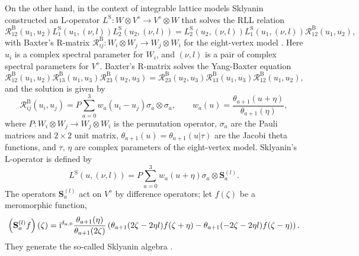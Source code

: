 On the other hand, in the context of integrable lattice models Sklyanin
constructed an L-operator $L^{\mathrm{S}}:W\otimes V^{\diamond}\rightarrow V^{\diamond}\otimes W$
that solves the RLL relation \cite{MR684124}
\begin{equation}
    \mathcal{R}_{12}^{\mathrm{B}}(u_{1},u_{2})
    L_{1}^{\mathrm{S}}(u_{1},(\nu,l))
    L_{2}^{\mathrm{S}}(u_{2},(\nu,l))
      =
          L_{2}^{\mathrm{S}}(u_{2},(\nu,l))
          L_{1}^{\mathrm{S}}(u_{1},(\nu,l))
          \mathcal{R}_{12}^{\mathrm{B}}(u_{1},u_{2}),
\end{equation}
with Baxter's R-matrix $\mathcal{R}_{ij}^{\mathrm{B}}:W_{i}\otimes W_{j}\rightarrow W_{j}\otimes W_{i}$
for the eight-vertex model \cite{Baxter:1971cr,Baxter:1972hz}. Here $u_{i}$
is a complex spectral parameter for $W_{i}$, and $(\nu,l)$
is a pair of complex spectral parameters for $V^{\diamond}$.
Baxter's R-matrix solves the Yang-Baxter equation
\begin{equation}
    \mathcal{R}_{12}^{\mathrm{B}}(u_{1},u_{2})
    \mathcal{R}_{13}^{\mathrm{B}}(u_{1},u_{3})
    \mathcal{R}_{23}^{\mathrm{B}}(u_{2},u_{3})
      =
        \mathcal{R}_{23}^{\mathrm{B}}(u_{2},u_{3})
        \mathcal{R}_{13}^{\mathrm{B}}(u_{1},u_{3})
        \mathcal{R}_{12}^{\mathrm{B}}(u_{1},u_{2}),
\end{equation}
and the solution is given by
\begin{equation}
    \mathcal{R}_{ij}^{\mathrm{B}}(u_{i},u_{j})
      =  P\sum_{a=0}^{3}w_{a}(u_{i}-u_{j})  \sigma_{a}  \otimes  \sigma_{a},
        \qquad  w_{a}(u)  =  \frac{\theta_{a+1}(u+\eta)}{\theta_{a+1}(\eta)},
\end{equation}
where $P:W_{i}\otimes W_{j}\to W_{j}\otimes W_{i}$ is the
permutation operator, $\sigma_{a}$ are the Pauli matrices and $2\times2$
unit matrix, $\theta_{a+1}(u)=\theta_{a+1}(u|\tau)$ are the Jacobi
theta functions, and $\tau,\,\eta$ are complex parameters of the
eight-vertex model. Sklyanin's L-operator is defined by
\begin{equation}
    L^{\mathrm{S}}(u,(\nu,l))
      =  P\sum_{a=0}^{3}w_{a}(u+\eta)  \sigma_{a}  \otimes  \mathbf{S}_{a}^{(l)}.
\end{equation}
The operators $\mathbf{S}_{a}^{(l)}$ act on $V^{\diamond}$ by difference operators;
let $f(\zeta)$ be a meromorphic function,
\begin{equation}
    \left(\mathbf{S}_{a}^{(l)}f\right)(\zeta)
      = \mathrm{i}^{\delta_{a,0}}\frac{\theta_{a+1}(\eta)}{\theta_{a+1}(2\zeta)}
          \left(\theta_{a+1}(2\zeta-2\eta l)f(\zeta+\eta)-\theta_{a+1}(-2\zeta-2\eta l)f(\zeta-\eta)\right).
\end{equation}
They generate the so-called Sklyanin algebra \cite{MR725414}.

